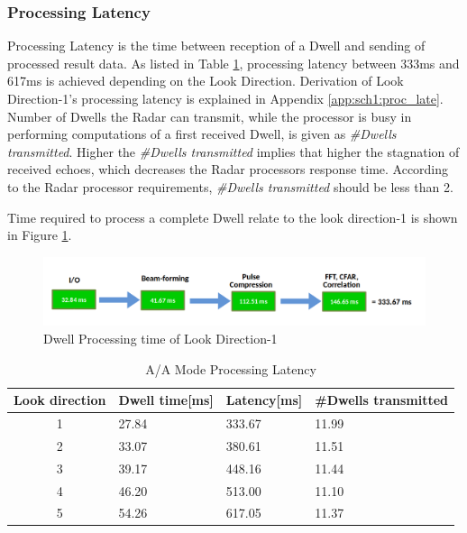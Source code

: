 \subsubsection{Processing Latency}
\label{sss:scheme1:latency}
Processing Latency is the time between reception of a Dwell and sending of processed result data. As listed in Table \ref{tbl:existing_analysis:aa_scheme1_latency}, processing latency between 333ms and 617ms is achieved depending on the Look Direction.  Derivation of Look Direction-1's processing latency is explained in Appendix \ref{app:sch1:proc_late}. Number of Dwells the Radar can transmit, while the processor is busy in performing computations of a first received Dwell, is given as \textsl{\#Dwells transmitted}. Higher the \textsl{\#Dwells transmitted} implies that higher the stagnation of received echoes, which decreases the Radar processors response time. According to the Radar processor requirements, \textsl{\#Dwells transmitted} should be less than 2.

Time required to process a complete Dwell relate to the look direction-1 is shown in Figure \ref{fig:mm:scheme1_latency_tot}.
\begin{figure}[h!]
	\centering
	\includegraphics[width=145mm]{figures/scheme1_latency_tot}
	\caption{Dwell Processing time of Look Direction-1}
	\label{fig:mm:scheme1_latency_tot}
\end{figure}


\begin{table}[h!]
	\centering
	\begin{tabular}{|c|l|l|l|} 
	 \hline
	 \textbf{Look direction} & \textbf{Dwell time[ms]} & \textbf{Latency[ms]} & \textbf{\#Dwells transmitted} \\
	 \hline
	 1 & 27.84 & 333.67 & 11.99 \\ \hline
	 2 & 33.07 & 380.61 & 11.51 \\ \hline
	 3 & 39.17 & 448.16 & 11.44 \\ \hline
	 4 & 46.20 & 513.00 & 11.10 \\ \hline
	 5 & 54.26 & 617.05 & 11.37 \\ \hline
	\end{tabular}
	\caption{A/A Mode Processing Latency}
	\label{tbl:existing_analysis:aa_scheme1_latency}
\end{table}

